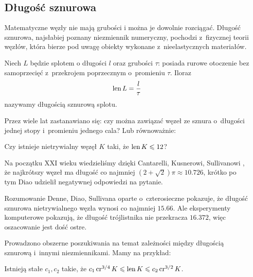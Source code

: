 
\subsection{Długość sznurowa}
%
Matematyczne węzły nie mają grubości i można je dowolnie rozciągać.
Długość sznurowa, najsłabiej poznany niezmiennik numeryczny, pochodzi z~fizycznej teorii węzłów, która bierze pod uwagę obiekty wykonane z~nieelastycznych materiałów.

\begin{definition}
    Niech $L$ będzie splotem o długości $l$ oraz grubości $\tau$: posiada rurowe otoczenie bez samoprzecięć z~przekrojem poprzecznym o~promieniu $\tau$.
    Iloraz
    \begin{equation}
        \operatorname{len} L = \frac l \tau
    \end{equation}
    nazywamy długością sznurową splotu.
\end{definition}

Przez wiele lat zastanawiano się: czy można zawiązać węzeł ze sznura o~długości jednej stopy i~promieniu jednego cala?
Lub równoważnie:

\begin{conjecture}
    Czy istnieje nietrywialny węzęł $K$ taki, że $\operatorname{len} K \leqslant 12$?
\end{conjecture}

Na początku XXI wieku wiedzieliśmy dzięki Cantarelli, Kusnerowi, Sullivanowi \cite{cantarella2002}, że najkrótszy węzeł ma długość co najmniej $(2 + \sqrt 2)\pi \approx 10.726$, krótko po tym Diao \cite[s. 14]{diao2003} udzielił negatywnej odpowiedzi na pytanie.
%
%
%
%

Rozumowanie Denne, Diao, Sullivana \cite{denne2006} oparte o~czterosieczne pokazuje, że długość sznurowa nietrywialnego węzła wynosi co najmniej $15.66$.
Ale eksperymenty komputerowe pokazują, że długość trójlistnika nie przekracza $16.372$, więc oszacowanie jest dość ostre.

Prowadzono obszerne poszukiwania na temat zależności między długością sznurową i~innymi niezmiennikami.
Mamy na przykład:

\begin{proposition}
    Istnieją stałe $c_1, c_2$ takie, że $c_1 \operatorname{cr}^{3/4} K \leqslant \operatorname{len} K \leqslant c_2 \operatorname{cr}^{3/2} K$.
\end{proposition}

